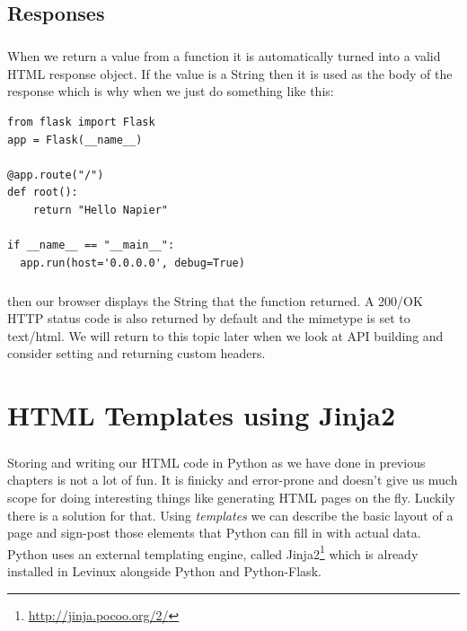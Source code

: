 \documentclass[12pt, a4paper, twoside]{book}
\begin{document}
\section{Responses}
\label{responses}
\paragraph{} When we return a value from a function it is automatically turned into a valid HTML response object. If the value is a String then it is used as the body of the response which is why when we just do something like this:

\begin{lstlisting}
from flask import Flask
app = Flask(__name__)

@app.route("/")
def root():
    return "Hello Napier"

if __name__ == "__main__":
  app.run(host='0.0.0.0', debug=True)
\end{lstlisting}

\paragraph{} then our browser displays the String that the function returned. A 200/OK HTTP status code is also returned by default and the mimetype is set to text/html. We will return to this topic later when we look at API building and consider setting and returning custom headers.



\chapter{HTML Templates using Jinja2}
\label{lab05}
\paragraph{} Storing and writing our HTML code in Python as we have done in previous chapters is not a lot of fun. It is finicky and error-prone and doesn't give us much scope for doing interesting things like generating HTML pages on the fly. Luckily there is a solution for that. Using \emph{templates} we can describe the basic layout of a page and sign-post those elements that Python can fill in with actual data. Python uses an external templating engine, called Jinja2\footnote{\url{http://jinja.pocoo.org/2/}} which is already installed in Levinux alongside Python and Python-Flask.
\end{document}
